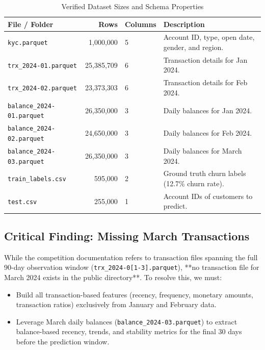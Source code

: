 \documentclass[11pt,a4paper]{article}
\begin{document}
\begin{table}[htbp]
\centering
\caption{Verified Dataset Sizes and Schema Properties}
\begin{tabular}{lrlp{8cm}}
\toprule
\textbf{File / Folder} & \textbf{Rows} & \textbf{Columns} & \textbf{Description} \\
\midrule
\texttt{kyc.parquet} & 1,000,000 & 5 & Account ID, type, open date, gender, and region. \\
\texttt{trx\_2024-01.parquet} & 25,385,709 & 6 & Transaction details for Jan 2024. \\
\texttt{trx\_2024-02.parquet} & 23,373,303 & 6 & Transaction details for Feb 2024. \\
\texttt{balance\_2024-01.parquet} & 26,350,000 & 3 & Daily balances for Jan 2024. \\
\texttt{balance\_2024-02.parquet} & 24,650,000 & 3 & Daily balances for Feb 2024. \\
\texttt{balance\_2024-03.parquet} & 26,350,000 & 3 & Daily balances for March 2024. \\
\texttt{train\_labels.csv} & 595,000 & 2 & Ground truth churn labels (12.7\% churn rate). \\
\texttt{test.csv} & 255,000 & 1 & Account IDs of customers to predict. \\
\bottomrule
\end{tabular}
\end{table}

\subsection{Critical Finding: Missing March Transactions}
While the competition documentation refers to transaction files spanning the full 90-day observation window (\texttt{trx\_2024-0[1-3].parquet}), **no transaction file for March 2024 exists in the public directory**. 
To resolve this, we must:
\begin{itemize}
    \item Build all transaction-based features (recency, frequency, monetary amounts, transaction ratios) exclusively from January and February data.
    \item Leverage March daily balances (\texttt{balance\_2024-03.parquet}) to extract balance-based recency, trends, and stability metrics for the final 30 days before the prediction window.
\end{itemize}
\end{document}
